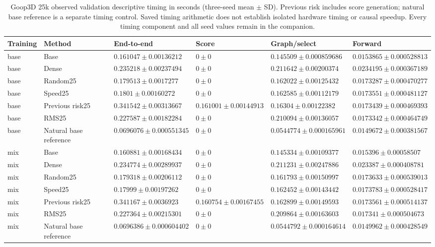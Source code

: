\begin{table}[p]
\centering\scriptsize
\caption{Goop3D 25k observed validation descriptive timing in seconds (three-seed mean $\pm$ SD). Previous risk includes score generation; natural base reference is a separate timing control. Saved timing arithmetic does not establish isolated hardware timing or causal speedup. Every timing component and all seed values remain in the companion.}
\label{tab:goop3d25k-observed-timing-validation}
\setlength{\tabcolsep}{3pt}
\begin{tabular}{llllll}
\toprule
Training & Method & End-to-end & Score & Graph/select & Forward\\
\midrule
base & Base & $0.161047\pm0.00136212$ & $0\pm0$ & $0.145509\pm0.000859686$ & $0.0153865\pm0.000528813$\\
base & Dense & $0.235218\pm0.00237494$ & $0\pm0$ & $0.211642\pm0.00200374$ & $0.0234195\pm0.000367189$\\
base & Random25 & $0.179513\pm0.0017277$ & $0\pm0$ & $0.162022\pm0.00125432$ & $0.0173287\pm0.000470277$\\
base & Speed25 & $0.1801\pm0.00160272$ & $0\pm0$ & $0.162585\pm0.00112179$ & $0.0173551\pm0.000481127$\\
base & Previous risk25 & $0.341542\pm0.00313667$ & $0.161001\pm0.00144913$ & $0.16304\pm0.00122382$ & $0.0173439\pm0.000469393$\\
base & RMS25 & $0.227587\pm0.00182284$ & $0\pm0$ & $0.210094\pm0.00136057$ & $0.0173342\pm0.000464749$\\
base & Natural base reference & $0.0696076\pm0.000551345$ & $0\pm0$ & $0.0544774\pm0.000165961$ & $0.0149672\pm0.000381567$\\
mix & Base & $0.160881\pm0.00168434$ & $0\pm0$ & $0.145334\pm0.00109377$ & $0.015396\pm0.00058507$\\
mix & Dense & $0.234774\pm0.00289937$ & $0\pm0$ & $0.211231\pm0.00247886$ & $0.023387\pm0.000408781$\\
mix & Random25 & $0.179318\pm0.00206112$ & $0\pm0$ & $0.161793\pm0.00150997$ & $0.0173633\pm0.000539013$\\
mix & Speed25 & $0.17999\pm0.00197262$ & $0\pm0$ & $0.162452\pm0.00143442$ & $0.0173783\pm0.000528417$\\
mix & Previous risk25 & $0.341167\pm0.0036923$ & $0.160754\pm0.00167455$ & $0.162899\pm0.00149593$ & $0.0173561\pm0.000514137$\\
mix & RMS25 & $0.227364\pm0.00215301$ & $0\pm0$ & $0.209864\pm0.00163603$ & $0.017341\pm0.000504673$\\
mix & Natural base reference & $0.0696386\pm0.000604402$ & $0\pm0$ & $0.0544792\pm0.000164614$ & $0.0149962\pm0.000428549$\\
\bottomrule
\end{tabular}
\end{table}

